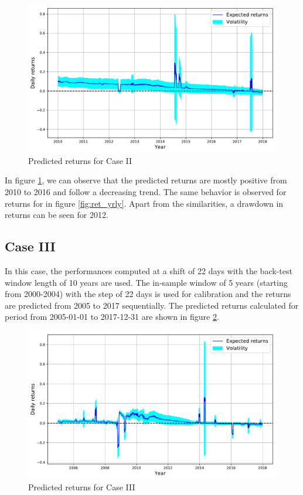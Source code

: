 \begin{figure}[h!] 
\centering
 \includegraphics[width=0.75\linewidth]{figures/exp_ret_llf10.pdf}
\caption{Predicted returns for Case II}
\label{fig:ret_mnthly10}
\end{figure}  


In figure \ref{fig:ret_mnthly10}, we can observe that the predicted returns are mostly positive from 2010 to 2016 and follow a decreasing trend. The same behavior is observed for returns for in figure \ref{fig:ret_yrly}. Apart from the similarities, a drawdown in returns can be seen for 2012.



\subsection{Case III}
In this case, the performances computed at a shift of 22 days with the back-test window length of 10 years are used. The in-sample window of 5 years (starting from 2000-2004) with the step of 22 days is used for calibration and the returns are predicted from 2005 to 2017 sequentially. The predicted returns calculated for period from 2005-01-01 to 2017-12-31 are shown in figure \ref{fig:ret_mnthly5}.

\begin{figure}[h!] 
\centering
 \includegraphics[width=0.75\linewidth]{figures/exp_ret_llf5.pdf}
\caption{Predicted returns for Case III}
\label{fig:ret_mnthly5}
\end{figure}  


